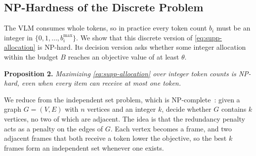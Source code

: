 \subsection{NP-Hardness of the Discrete Problem}
\label{sec:supp-nphard}

The VLM consumes whole tokens, so in practice every token count $b_i$ must be an integer in $\{0,1,\dots,b_i^{\max}\}$. We show that this discrete version of \cref{eq:supp-allocation} is NP-hard. Its decision version asks whether some integer allocation within the budget $B$ reaches an objective value of at least $\theta$.

\smallskip
\noindent\textbf{Proposition 2.} \textit{Maximizing \cref{eq:supp-allocation} over integer token counts is NP-hard, even when every item can receive at most one token.}

\smallskip
We reduce from the independent set problem, which is NP-complete~\cite{karp1972,garey1979}: given a graph $G=(V,E)$ with $n$ vertices and an integer $k$, decide whether $G$ contains $k$ vertices, no two of which are adjacent. The idea is that the redundancy penalty acts as a penalty on the edges of $G$. Each vertex becomes a frame, and two adjacent frames that both receive a token lower the objective, so the best $k$ frames form an independent set whenever one exists.

